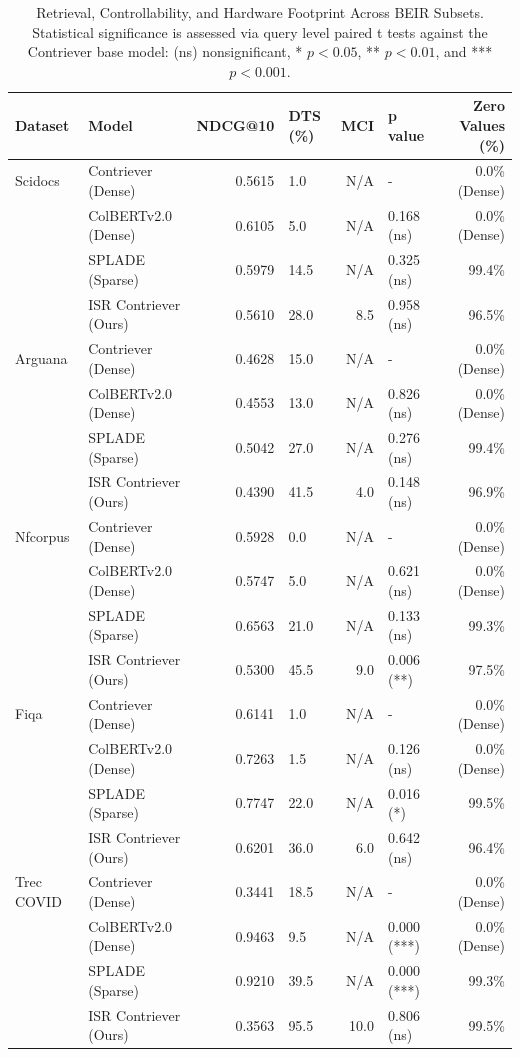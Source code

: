 \documentclass[sigconf,anonymous,screen]{acmart}
\begin{document}
\vspace{-6pt}
\begin{table}[htbp]
\centering
\caption{Retrieval, Controllability, and Hardware Footprint Across BEIR Subsets. Statistical significance is assessed via query level paired t tests against the Contriever base model: (ns) nonsignificant, * $p < 0.05$, ** $p < 0.01$, and *** $p < 0.001$.}
\vspace{-4pt}
\label{tab:beir_results}
\small
\renewcommand{\arraystretch}{0.80}
\begin{tabular}{llrlrlr}
\toprule
Dataset & Model & NDCG@10 & DTS (\%) & MCI & p value & Zero Values (\%) \\
\midrule
Scidocs & Contriever (Dense) & 0.5615 & 1.0 & N/A & - & 0.0\% (Dense) \\
& ColBERTv2.0 (Dense) & 0.6105 & 5.0 & N/A & 0.168 (ns) & 0.0\% (Dense) \\
& SPLADE (Sparse) & 0.5979 & 14.5 & N/A & 0.325 (ns) & 99.4\% \\
& ISR Contriever (Ours) & 0.5610 & 28.0 & 8.5 & 0.958 (ns) & 96.5\% \\
\midrule
Arguana & Contriever (Dense) & 0.4628 & 15.0 & N/A & - & 0.0\% (Dense) \\
& ColBERTv2.0 (Dense) & 0.4553 & 13.0 & N/A & 0.826 (ns) & 0.0\% (Dense) \\
& SPLADE (Sparse) & 0.5042 & 27.0 & N/A & 0.276 (ns) & 99.4\% \\
& ISR Contriever (Ours) & 0.4390 & 41.5 & 4.0 & 0.148 (ns) & 96.9\% \\
\midrule
Nfcorpus & Contriever (Dense) & 0.5928 & 0.0 & N/A & - & 0.0\% (Dense) \\
& ColBERTv2.0 (Dense) & 0.5747 & 5.0 & N/A & 0.621 (ns) & 0.0\% (Dense) \\
& SPLADE (Sparse) & 0.6563 & 21.0 & N/A & 0.133 (ns) & 99.3\% \\
& ISR Contriever (Ours) & 0.5300 & 45.5 & 9.0 & 0.006 (**) & 97.5\% \\
\midrule
Fiqa & Contriever (Dense) & 0.6141 & 1.0 & N/A & - & 0.0\% (Dense) \\
& ColBERTv2.0 (Dense) & 0.7263 & 1.5 & N/A & 0.126 (ns) & 0.0\% (Dense) \\
& SPLADE (Sparse) & 0.7747 & 22.0 & N/A & 0.016 (*) & 99.5\% \\
& ISR Contriever (Ours) & 0.6201 & 36.0 & 6.0 & 0.642 (ns) & 96.4\% \\
\midrule
Trec COVID & Contriever (Dense) & 0.3441 & 18.5 & N/A & - & 0.0\% (Dense) \\
& ColBERTv2.0 (Dense) & 0.9463 & 9.5 & N/A & 0.000 (***) & 0.0\% (Dense) \\
& SPLADE (Sparse) & 0.9210 & 39.5 & N/A & 0.000 (***) & 99.3\% \\
& ISR Contriever (Ours) & 0.3563 & 95.5 & 10.0 & 0.806 (ns) & 99.5\% \\
\bottomrule
\end{tabular}
\vspace{-10pt}
\end{table}
\end{document}
